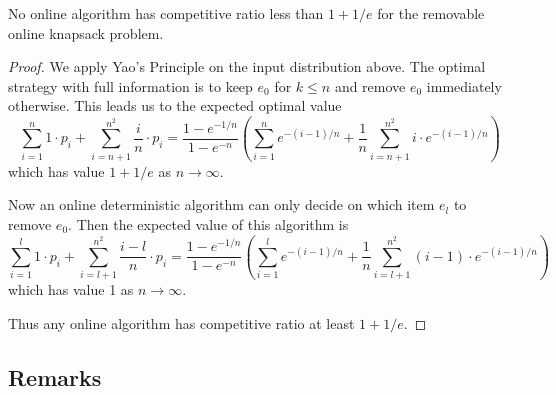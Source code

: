 \begin{theorem}
	\emph{\cite{han}}
	No online algorithm has competitive ratio less than $1+1/e$ for the removable online knapsack problem.
\end{theorem}
\begin{proof}
	We apply Yao's Principle on the input distribution above. The optimal strategy with full information is to keep $e_0$ for $k\le n$ and remove $e_0$ immediately otherwise. This leads us to the expected optimal value
	\[ \sum_{i=1}^n 1\cdot p_i + \sum_{i=n+1}^{n^2} \frac{i}{n}\cdot p_i = \frac{1-e^{-1/n}}{1-e^{-n}} \left( \sum_{i=1}^n e^{-(i-1)/n} + \frac{1}{n} \sum_{i=n+1}^{n^2} i\cdot e^{-(i-1)/n} \right) \]
	which has value $1+1/e$ as $n \rightarrow \infty$.

	Now an online deterministic algorithm can only decide on which item $e_l$ to remove $e_0$. Then the expected value of this algorithm is
	\[ \sum_{i=1}^l 1\cdot p_i + \sum_{i=l+1}^{n^2} \frac{i-l}{n}\cdot p_i = \frac{1-e^{-1/n}}{1-e^{-n}} \left( \sum_{i=1}^l e^{-(i-1)/n} + \frac{1}{n} \sum_{i=l+1}^{n^2} (i-1)\cdot e^{-(i-1)/n} \right) \]
which has value 1 as $n \rightarrow \infty$.

Thus any online algorithm has competitive ratio at least $1+1/e$.
\end{proof}

\subsection{Remarks}

